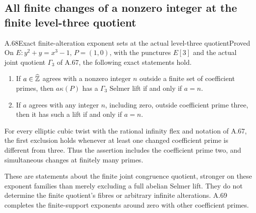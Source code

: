 \subsection{All finite changes of a nonzero integer at the finite level-three quotient}

\begin{statement}{A.68}{Exact finite-alteration exponent sets at the actual level-three quotient}{Proved}
On $E:y^2+y=x^3-1$, $P=(1,0)$, with the
punctures $E[3]$ and the actual joint quotient
$\Gamma_3$ of A.67, the following exact
statements hold.
\begin{enumerate}
\item If $a\in\widehat{\mathbb Z}$ agrees with a
      nonzero integer $n$ outside a finite
      set of coefficient primes, then
      $a\kappa(P)$ has a $\Gamma_3$ Selmer
      lift if and only if $a=n$.
\item If $a$ agrees with any integer $n$,
      including zero, outside coefficient
      prime three, then it has such a
      lift if and only if $a=n$.
\end{enumerate}
For every elliptic cubic twist with the
rational infinity flex and notation of A.67,
the first exclusion holds whenever at least
one changed coefficient prime is different
from three. Thus the assertion includes
the coefficient prime two, and simultaneous
changes at finitely many primes.

These are statements about the finite
joint congruence quotient, stronger on
these exponent families than merely
excluding a full abelian Selmer lift.
They do not determine the finite quotient's
fibres or arbitrary infinite alterations.
A.69 completes the finite-support exponents
around zero with other coefficient primes.
\end{statement}
